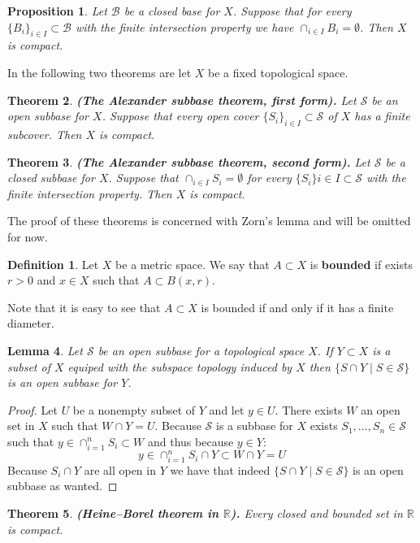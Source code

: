 \documentclass[11pt,a4paper]{article}
\theoremstyle{definition}
\newtheorem{definition}{Definition}[section]
\theoremstyle{plain}
\newtheorem{theorem}{Theorem}[section]
\newtheorem{proposition}[theorem]{Proposition}
\newtheorem{lemma}[theorem]{Lemma}
\newcommand{\R}{\mathbb{R}}
\renewcommand{\tt}[1]{\textnormal{\textbf{(#1).}}} %
\begin{document}
	\begin{proposition}
		Let $\mathcal{B}$ be a closed base for $X$. Suppose that for every 
		$\{B_i\}_{i \in I} \subset \mathcal{B}$ with the finite intersection 
		property we have $\cap_{i \in I}{B_i} = \emptyset$. Then $X$ is 
		compact.
	\end{proposition}
	In the following two theorems are let $X$ be a fixed topological space.
	\begin{theorem}
		\tt{The Alexander subbase theorem, first form}
		Let $\mathcal{S}$ be an open subbase for $X$. Suppose that every 
		open cover $\{S_i\}_{i \in I} \subset \mathcal{S}$ of $X$ has a 
		finite subcover. Then $X$ is compact.
	\end{theorem}
	\begin{theorem}
	\tt{The Alexander subbase theorem, second form}
	Let $\mathcal{S}$ be a closed subbase for $X$. Suppose that 
	$\cap_{i \in I}{S_i} = \emptyset$ for every 
	$\{S_i\}{i \in I} \subset \mathcal{S}$ with the finite intersection 
	property. Then $X$ is compact.
	\end{theorem}
	The proof of these theorems is concerned with Zorn's lemma and will
	be omitted for now.
	\begin{definition}
		Let $X$ be a metric space. We say that $A \subset X$ is 
		\textbf{bounded} if exists $r > 0$ and $x \in X$ such that
		$A \subset B(x,r)$.
	\end{definition}
	Note that it is easy to see that $A \subset X$ is bounded if and only
	if it has a finite diameter.
	\begin{lemma}
		Let $\mathcal{S}$ be an open subbase for a topological space $X$.
		If $Y \subset X$ is a subset of $X$ equiped with the subspace
		topology induced by $X$ then $\{S \cap Y \mid S \in \mathcal{S}\}$
		is an open subbase for $Y$.
	\end{lemma}
	\begin{proof}
		Let $U$ be a nonempty subset of $Y$ and let $y \in U$. There
		exists $W$ an open set in $X$ such that $W \cap Y = U$. Because
		$\mathcal{S}$ is a subbase for $X$ exists 
		$S_1,\dots,S_n \in \mathcal{S}$ such that 
		$y \in \cap_{i=1}^{n}{S_i} \subset W$ and thus because $y \in Y$:
		\[
			y \in \cap_{i=1}^{n}{S_i \cap Y} \subset W \cap Y = U
		\]
		Because $S_i \cap Y$ are all open in $Y$ we have that indeed
		$\{S \cap Y \mid S \in \mathcal{S}\}$ is an open subbase as wanted.
	\end{proof}
	\begin{theorem}
		\tt{Heine–Borel theorem in $\R$}
		Every closed and bounded set in $\R$ is compact.
	\end{theorem}
\end{document}
